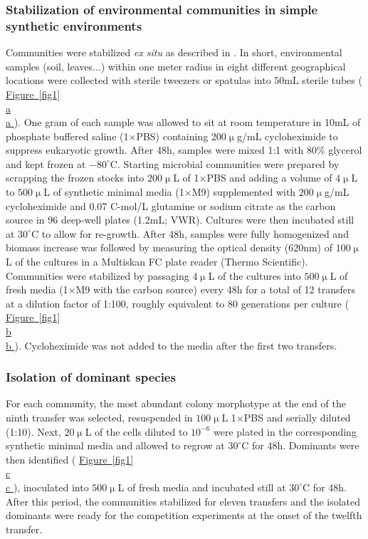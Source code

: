 \documentclass[a4paper,10pt]{article}
\newcommand{\figref}[2][]{%
  \hyperref[{#2}]{%
    Figure~\ref*{#2}%
    \ifx\\#1\\%
    \else
      #1%
    \fi
  }%
}
\begin{document}
\subsubsection*{Stabilization of environmental communities in simple synthetic environments}
\label{methods:community-assembly}

Communities were stabilized \textit{ex situ} as described in \cite{Goldford2018}.
In short, environmental samples (soil, leaves...) within one meter radius in eight different
geographical locations were collected with sterile
tweezers or spatulas into 50mL sterile tubes (\figref[a]{fig1}).
One gram of each sample was allowed to
sit at room temperature in 10mL of phosphate buffered saline (1$\times$PBS) containing
200$\upmu$g/mL cycloheximide to suppress eukaryotic growth.
After 48h, samples were mixed 1:1 with 80\% glycerol and kept frozen at $-80^\circ$C.
Starting microbial communities were prepared by scrapping the frozen stocks into
$200\upmu$L of 1$\times$PBS and adding a volume of $4\upmu$L to $500\upmu$L
of synthetic minimal media (1$\times$M9) supplemented with $200\upmu$g/mL cycloheximide
and 0.07 C-mol/L glutamine or sodium citrate as the carbon source in 96 deep-well plates
(1.2mL; VWR).
Cultures were then incubated still at $30^\circ$C to allow for re-growth.
After 48h, samples were fully homogenized and biomass increase was followed by measuring
the optical density (620nm) of $100\upmu$L of the cultures in a Multiskan FC plate reader
(Thermo Scientific).
Communities were stabilized \cite{Goldford2018} by passaging $4\upmu$L of the cultures into
$500\upmu$L of fresh media (1$\times$M9 with the carbon source)  every 48h for a total of
12 transfers at a dilution factor of 1:100,
roughly equivalent to 80 generations per culture (\figref[b]{fig1}).
Cycloheximide was not added to the media after the first two transfers.

\subsubsection*{Isolation of dominant species}\label{methods:dominants}

For each community, the most abundant colony morphotype at the end of the ninth transfer
was selected, resuspended in $100\upmu$L 1$\times$PBS and serially diluted (1:10).
Next, $20\upmu$L of the cells diluted to $10^{-6}$ were plated in the corresponding synthetic
minimal media and allowed to regrow at $30^\circ$C for 48h. Dominants were then identified
(\figref[c]{fig1}),
inoculated into $500\upmu$L of fresh media and incubated still at $30^\circ$C for 48h.
After this period, the communities stabilized for eleven transfers and the isolated dominants
were ready for the competition experiments at the onset of the twelfth transfer.
\end{document}
